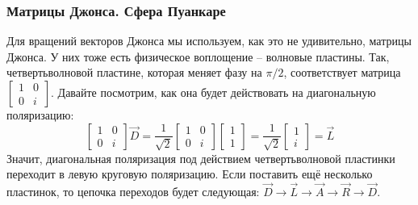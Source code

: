 \subsubsection{Матрицы Джонса. Сфера Пуанкаре}
Для вращений векторов Джонса мы используем, как это не удивительно, матрицы Джонса. У них тоже есть физическое воплощение -- волновые пластины. Так, четвертьволновой пластине, которая меняет фазу на $\pi/2$, соответствует матрица $\begin{bmatrix} 1 & 0 \\ 0 & i \end{bmatrix}$. Давайте посмотрим, как она будет действовать на диагональную поляризацию:
\[
\begin{bmatrix} 1 & 0 \\ 0 & i \end{bmatrix}\Vec{D} = \frac{1}{\sqrt{2}}\begin{bmatrix} 1 & 0 \\ 0 & i \end{bmatrix}\begin{bmatrix} 1 \\ 1 \end{bmatrix} = \frac{1}{\sqrt{2}}\begin{bmatrix} 1 \\ i \end{bmatrix} = \Vec{L}
\]
Значит, диагональная поляризация под действием четвертьволновой пластинки переходит в левую круговую поляризацию. Если поставить ещё несколько пластинок, то цепочка переходов будет следующая: $\Vec{D} \rightarrow \Vec{L} \rightarrow \Vec{A} \rightarrow \Vec{R}\rightarrow \Vec{D}$.

